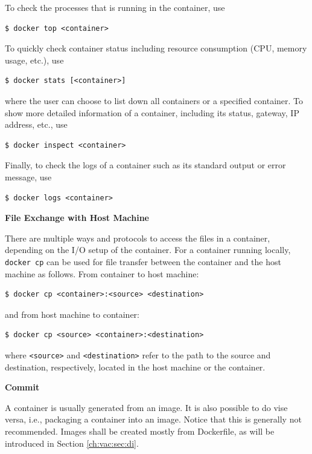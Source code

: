 To check the processes that is running in the container, use
\begin{lstlisting}
$ docker top <container>
\end{lstlisting}

To quickly check container status including resource consumption (CPU, memory usage, etc.), use
\begin{lstlisting}
$ docker stats [<container>]
\end{lstlisting}
where the user can choose to list down all containers or a specified container. To show more detailed information of a container, including its status, gateway, IP address, etc., use
\begin{lstlisting}
$ docker inspect <container>
\end{lstlisting}
Finally, to check the logs of a container such as its standard output or error message, use
\begin{lstlisting}
$ docker logs <container>
\end{lstlisting}

\vspace{0.1in}
\noindent \textbf{File Exchange with Host Machine}
\vspace{0.1in}

There are multiple ways and protocols to access the files in a container, depending on the I/O setup of the container. For a container running locally, \verb|docker cp| can be used for file transfer between the container and the host machine as follows. From container to host machine:
\begin{lstlisting}
$ docker cp <container>:<source> <destination>
\end{lstlisting}
and from host machine to container:
\begin{lstlisting}
$ docker cp <source> <container>:<destination>
\end{lstlisting}
where \verb|<source>| and \verb|<destination>| refer to the path to the source and destination, respectively, located in the host machine or the container.

\vspace{0.1in}
\noindent \textbf{Commit}
\vspace{0.1in}

A container is usually generated from an image. It is also possible to do vise versa, i.e., packaging a container into an image. Notice that this is generally not recommended. Images shall be created mostly from Dockerfile, as will be introduced in Section \ref{ch:vac:sec:di}.


